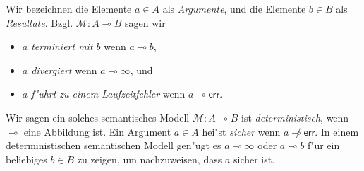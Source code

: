\documentclass[12pt,a4paper,final]{article}
\begin{document}
Wir bezeichnen die Elemente $a \in A$ als \emph{Argumente}, und die Elemente $b \in B$
als \emph{Resultate}. Bzgl. $\mathcal{M}: A \multimap B$ sagen wir
\begin{itemize}
\item \emph{$a$ terminiert mit $b$} wenn $a \multimap b$,
\item \emph{$a$ divergiert} wenn $a \multimap \infty$, und
\item \emph{$a$ f"uhrt zu einem Laufzeitfehler} wenn $a \multimap \textsf{err}$.
\end{itemize}
Wir sagen ein solches semantisches Modell \mbox{$\mathcal{M}: A \multimap B$} ist \emph{deterministisch},
wenn $\multimap$ eine Abbildung ist. Ein Argument \mbox{$a \in A$} hei"st \emph{sicher} wenn
\mbox{$a \not\multimap \textsf{err}$}. In einem deterministischen semantischen Modell gen"ugt es
\mbox{$a \multimap \infty$} oder \mbox{$a \multimap b$} f"ur ein beliebiges \mbox{$b \in B$} zu zeigen,
um nachzuweisen, dass $a$ sicher ist.





\end{document}
